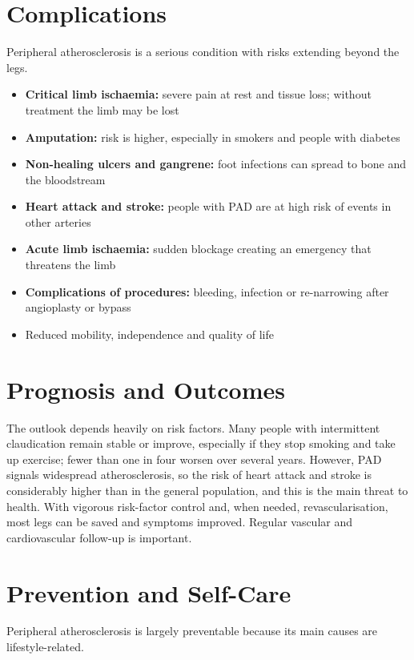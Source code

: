 \section*{Complications}
Peripheral atherosclerosis is a serious condition with risks extending beyond the legs.

\begin{itemize}
    \item \textbf{Critical limb ischaemia:} severe pain at rest and tissue loss; without treatment the limb may be lost
    \item \textbf{Amputation:} risk is higher, especially in smokers and people with diabetes
    \item \textbf{Non-healing ulcers and gangrene:} foot infections can spread to bone and the bloodstream
    \item \textbf{Heart attack and stroke:} people with PAD are at high risk of events in other arteries
    \item \textbf{Acute limb ischaemia:} sudden blockage creating an emergency that threatens the limb
    \item \textbf{Complications of procedures:} bleeding, infection or re-narrowing after angioplasty or bypass
    \item Reduced mobility, independence and quality of life
\end{itemize}

\section*{Prognosis and Outcomes}
The outlook depends heavily on risk factors. Many people with intermittent claudication remain stable or improve, especially if they stop smoking and take up exercise; fewer than one in four worsen over several years. However, PAD signals widespread atherosclerosis, so the risk of heart attack and stroke is considerably higher than in the general population, and this is the main threat to health. With vigorous risk-factor control and, when needed, revascularisation, most legs can be saved and symptoms improved. Regular vascular and cardiovascular follow-up is important.

\section*{Prevention and Self-Care}
Peripheral atherosclerosis is largely preventable because its main causes are lifestyle-related.

